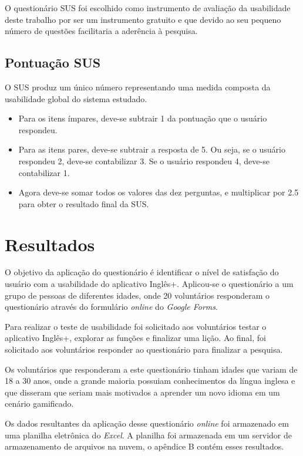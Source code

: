 \documentclass[
	12pt,				%
	openany,			%
	oneside,			%
	a4paper,			%
	english,			%
	french,				%
	spanish,			%
	brazil				%
	]{abntex2}
\begin{document}
O questionário SUS foi escolhido como instrumento de avaliação da usabilidade deste trabalho por ser um instrumento gratuito e que devido ao seu pequeno número de questões facilitaria a aderência à pesquisa.

\subsection{Pontuação SUS}
O SUS produz um único número representando uma medida composta da usabilidade global do sistema estudado. 

\begin{itemize}
\item Para os itens ímpares, deve-se subtrair 1 da pontuação que o usuário respondeu.
\item Para as itens pares, deve-se subtrair a resposta de 5. Ou seja, se o usuário respondeu 2, deve-se contabilizar 3. Se o usuário respondeu 4, deve-se contabilizar 1.
\item Agora deve-se somar todos os valores das dez perguntas, e multiplicar por 2.5 para obter o resultado final da SUS.


\end{itemize}



\section{Resultados}
O objetivo da aplicação do questionário é identificar o nível de satisfação do usuário com a usabilidade do aplicativo Inglês+. Aplicou-se o questionário a um grupo de pessoas de diferentes idades, onde 20 voluntários responderam o questionário através do formulário \textit{online} do \textit{Google Forms}.

Para realizar o teste de usabilidade foi solicitado aos voluntários testar o aplicativo Inglês+, explorar as funções e finalizar uma lição. Ao final, foi solicitado aos voluntários responder ao questionário para finalizar a pesquisa.

Os voluntários que responderam a este questionário tinham idades que variam de 18 a 30 anos, onde a grande maioria possuiam conhecimentos da língua inglesa e que disseram que seriam mais motivados a aprender um novo idioma em um cenário gamificado.

Os dados resultantes da aplicação desse questionário \textit{online} foi armazenado em uma planilha eletrônica do \textit{Excel}. A planilha foi armazenada em um servidor de armazenamento de arquivos na nuvem, o apêndice B contém esses resultados.
\end{document}
